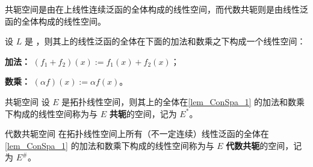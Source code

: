 
\cite{Ke1}共轭空间是由在上线性连续泛函的全体构成的线性空间，而代数共轭则是由线性泛函的全体构成的线性空间。

\begin{lemma}{}\label{lem_ConSpa_1}
设 $L$ 是 ，则其上的线性泛函的全体在下面的加法和数乘之下构成一个线性空间：

\textbf{加法：} $(f_1+f_2)(x):=f_1(x)+f_2(x)$；

\textbf{数乘：} $(\alpha f)(x):=\alpha f(x)$。
\end{lemma}

\begin{definition}{共轭空间}
设 $E$ 是拓扑线性空间，则其上的全体在\autoref{lem_ConSpa_1} 的加法和数乘下构成的线性空间称为与 $E$ \textbf{共轭}的空间，记为 $E^*$。
\end{definition}

\begin{definition}{代数共轭空间}
在拓扑线性空间上所有（不一定连续）线性泛函的全体在\autoref{lem_ConSpa_1} 的加法和数乘下构成的线性空间称为与 $E$ \textbf{代数共轭}的空间，记为 $E^{\#}$。
\end{definition}




